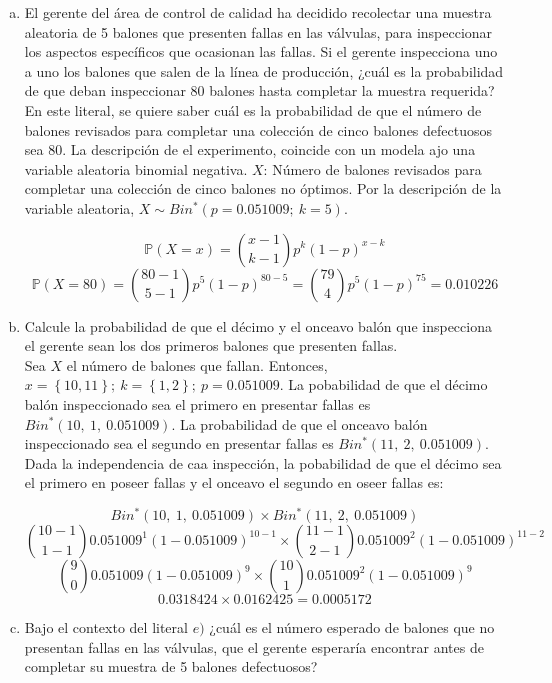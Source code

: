 \documentclass[11pt, spanish]{article}
\begin{document}
\begin{enumerate}[(a)]
\item El gerente del área de control de calidad ha decidido recolectar una muestra
aleatoria de 5 balones que presenten fallas en las válvulas, para inspeccionar los aspectos
específicos que ocasionan las fallas. Si el gerente inspecciona uno a uno los balones que
salen de la línea de producción, ¿cuál es la probabilidad de que deban inspeccionar 80
balones hasta completar la muestra requerida?\\

En este literal, se quiere saber cuál es la probabilidad de que el número de balones revisados para completar una colección de cinco balones defectuosos sea 80. La descripción de el experimento, coincide con un modela ajo una variable aleatoria binomial negativa. $X$: Número de balones revisados para completar una colección de cinco balones no óptimos. Por la descripción de la variable aleatoria, $X \sim Bin^{*}(p = 0.051009;\ k = 5)$. 

$$\mathbb{P}(X = x) = \binom{x - 1}{k - 1}p^k(1 - p)^{x - k}$$
$$\mathbb{P}(X = 80) = \binom{80 - 1}{5 - 1}p^5(1 - p)^{80 - 5} = \binom{79}{4}p^5(1 - p)^{75} = 0.010226$$

\item Calcule la probabilidad de que el décimo y el onceavo balón que inspecciona el
gerente sean los dos primeros balones que presenten fallas.\\

Sea $X$ el número de balones que fallan. Entonces, $x = \left\{ 10, 11\right\};\ k = \left\{ 1, 2\right\};\ p = 0.051009$. La pobabilidad de que el décimo balón inspeccionado sea el primero en presentar fallas es $Bin^*(10,\ 1,\ 0.051009)$. La probabilidad de que el onceavo balón inspeccionado sea el segundo en presentar fallas es $Bin^*(11,\ 2,\ 0.051009)$. Dada la independencia de caa inspección, la pobabilidad de que el décimo sea el primero en poseer fallas y el onceavo el segundo en oseer fallas es: 

$$Bin^*(10,\ 1,\ 0.051009) \times Bin^*(11,\ 2,\ 0.051009)$$
$$\binom{10 - 1}{1 - 1}0.051009^1(1 - 0.051009)^{10 - 1} \times \binom{11 - 1}{2 - 1}0.051009^2(1 - 0.051009)^{11 - 2}$$
$$\binom{9}{0}0.051009(1 - 0.051009)^{9} \times \binom{10}{1}0.051009^2(1 - 0.051009)^{9}$$
$$0.0318424 \times 0.0162425 = 0.0005172$$

\item Bajo el contexto del literal $e)$ ¿cuál es el número esperado de balones que no
presentan fallas en las válvulas, que el gerente esperaría encontrar antes de completar su
muestra de 5 balones defectuosos?\\


\end{enumerate}
\end{document}

